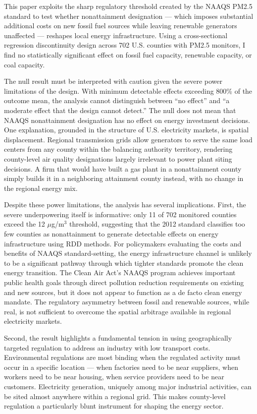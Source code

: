 \documentclass[12pt]{article}
\begin{document}
This paper exploits the sharp regulatory threshold created by the NAAQS PM2.5 standard to test whether nonattainment designation --- which imposes substantial additional costs on new fossil fuel sources while leaving renewable generators unaffected --- reshapes local energy infrastructure. Using a cross-sectional regression discontinuity design across 702 U.S. counties with PM2.5 monitors, I find no statistically significant effect on fossil fuel capacity, renewable capacity, or coal capacity.

The null result must be interpreted with caution given the severe power limitations of the design. With minimum detectable effects exceeding 800\% of the outcome mean, the analysis cannot distinguish between ``no effect'' and ``a moderate effect that the design cannot detect.'' The null does not mean that NAAQS nonattainment designation has no effect on energy investment decisions. One explanation, grounded in the structure of U.S. electricity markets, is spatial displacement. Regional transmission grids allow generators to serve the same load centers from any county within the balancing authority territory, rendering county-level air quality designations largely irrelevant to power plant siting decisions. A firm that would have built a gas plant in a nonattainment county simply builds it in a neighboring attainment county instead, with no change in the regional energy mix.

Despite these power limitations, the analysis has several implications. First, the severe underpowering itself is informative: only 11 of 702 monitored counties exceed the 12 $\mu$g/m$^3$ threshold, suggesting that the 2012 standard classifies too few counties as nonattainment to generate detectable effects on energy infrastructure using RDD methods. For policymakers evaluating the costs and benefits of NAAQS standard-setting, the energy infrastructure channel is unlikely to be a significant pathway through which tighter standards promote the clean energy transition. The Clean Air Act's NAAQS program achieves important public health goals through direct pollution reduction requirements on existing and new sources, but it does not appear to function as a de facto clean energy mandate. The regulatory asymmetry between fossil and renewable sources, while real, is not sufficient to overcome the spatial arbitrage available in regional electricity markets.

Second, the result highlights a fundamental tension in using geographically targeted regulation to address an industry with low transport costs. Environmental regulations are most binding when the regulated activity must occur in a specific location --- when factories need to be near suppliers, when workers need to be near housing, when service providers need to be near customers. Electricity generation, uniquely among major industrial activities, can be sited almost anywhere within a regional grid. This makes county-level regulation a particularly blunt instrument for shaping the energy sector.
\end{document}
